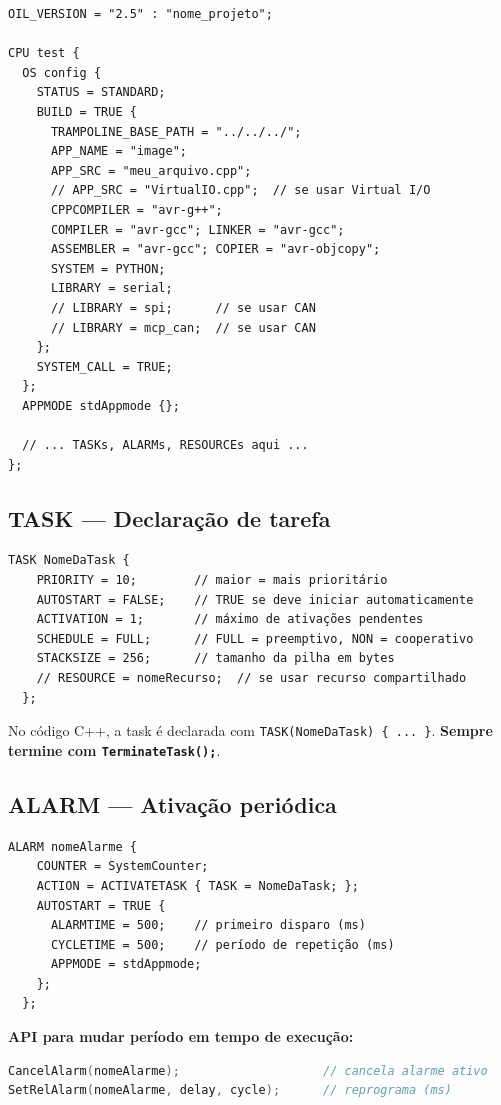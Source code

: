 \documentclass[12pt,a4paper]{article}
\begin{document}
\begin{lstlisting}[language=OIL]
OIL_VERSION = "2.5" : "nome_projeto";

CPU test {
  OS config {
    STATUS = STANDARD;
    BUILD = TRUE {
      TRAMPOLINE_BASE_PATH = "../../../";
      APP_NAME = "image";
      APP_SRC = "meu_arquivo.cpp";
      // APP_SRC = "VirtualIO.cpp";  // se usar Virtual I/O
      CPPCOMPILER = "avr-g++";
      COMPILER = "avr-gcc"; LINKER = "avr-gcc";
      ASSEMBLER = "avr-gcc"; COPIER = "avr-objcopy";
      SYSTEM = PYTHON;
      LIBRARY = serial;
      // LIBRARY = spi;      // se usar CAN
      // LIBRARY = mcp_can;  // se usar CAN
    };
    SYSTEM_CALL = TRUE;
  };
  APPMODE stdAppmode {};

  // ... TASKs, ALARMs, RESOURCEs aqui ...
};
\end{lstlisting}

\subsection{TASK --- Declaração de tarefa}

\begin{lstlisting}[language=OIL]
  TASK NomeDaTask {
    PRIORITY = 10;        // maior = mais prioritário
    AUTOSTART = FALSE;    // TRUE se deve iniciar automaticamente
    ACTIVATION = 1;       // máximo de ativações pendentes
    SCHEDULE = FULL;      // FULL = preemptivo, NON = cooperativo
    STACKSIZE = 256;      // tamanho da pilha em bytes
    // RESOURCE = nomeRecurso;  // se usar recurso compartilhado
  };
\end{lstlisting}

No código C++, a task é declarada com \texttt{TASK(NomeDaTask) \{ ... \}}. \textbf{Sempre termine com \texttt{TerminateTask();}}.

\subsection{ALARM --- Ativação periódica}

\begin{lstlisting}[language=OIL]
  ALARM nomeAlarme {
    COUNTER = SystemCounter;
    ACTION = ACTIVATETASK { TASK = NomeDaTask; };
    AUTOSTART = TRUE {
      ALARMTIME = 500;    // primeiro disparo (ms)
      CYCLETIME = 500;    // período de repetição (ms)
      APPMODE = stdAppmode;
    };
  };
\end{lstlisting}

\textbf{API para mudar período em tempo de execução:}
\begin{lstlisting}[language=C++]
CancelAlarm(nomeAlarme);                    // cancela alarme ativo
SetRelAlarm(nomeAlarme, delay, cycle);      // reprograma (ms)
\end{lstlisting}
\end{document}
